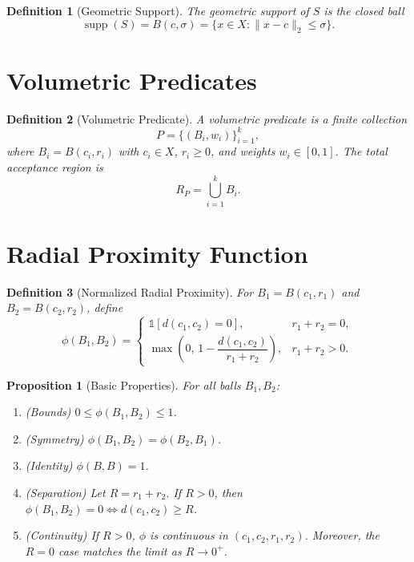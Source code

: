 \documentclass[11pt]{article}
\newtheorem{definition}{Definition}
\newtheorem{proposition}{Proposition}
\DeclareMathOperator*{\supp}{supp}
\newcommand{\bbone}{\mathbb{1}}
\begin{document}
\begin{definition}[Geometric Support]
The geometric support of $S$ is the closed ball
\begin{equation}
\supp(S)=B(c,\sigma)=\{x\in X:\|x-c\|_2\le \sigma\}.
\end{equation}
\end{definition}

\section{Volumetric Predicates}

\begin{definition}[Volumetric Predicate]
A volumetric predicate is a finite collection
\begin{equation}
P=\{(B_i,w_i)\}_{i=1}^{k},
\end{equation}
where $B_i=B(c_i,r_i)$ with $c_i\in X$, $r_i\ge 0$, and weights $w_i\in[0,1]$. The total acceptance region is
\begin{equation}
R_P=\bigcup_{i=1}^{k} B_i.
\end{equation}
\end{definition}

\section{Radial Proximity Function}

\begin{definition}[Normalized Radial Proximity]
For $B_1=B(c_1,r_1)$ and $B_2=B(c_2,r_2)$, define
\begin{equation}
\phi(B_1,B_2)=
\begin{cases}
\bbone[d(c_1,c_2)=0], & r_1+r_2=0,\\[4pt]
\max\!\left(0,\,1-\dfrac{d(c_1,c_2)}{r_1+r_2}\right), & r_1+r_2>0.
\end{cases}
\end{equation}
\end{definition}

\begin{proposition}[Basic Properties]
For all balls $B_1,B_2$:
\begin{enumerate}[label=(\alph*)]
\item (Bounds) $0\le \phi(B_1,B_2)\le 1$.
\item (Symmetry) $\phi(B_1,B_2)=\phi(B_2,B_1)$.
\item (Identity) $\phi(B,B)=1$.
\item (Separation) Let $R=r_1+r_2$. If $R>0$, then $\phi(B_1,B_2)=0 \iff d(c_1,c_2)\ge R$.
\item (Continuity) If $R>0$, $\phi$ is continuous in $(c_1,c_2,r_1,r_2)$. Moreover, the $R=0$ case matches the limit as $R\to 0^+$.
\end{enumerate}
\end{proposition}
\end{document}
